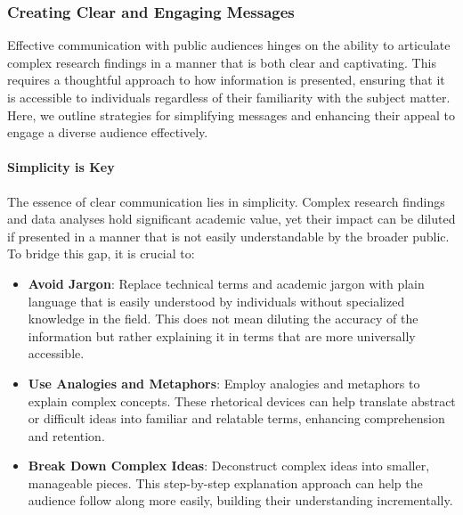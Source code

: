 \documentclass[
]{book}
\begin{document}
\hypertarget{creating-clear-and-engaging-messages}{%
\subsubsection*{Creating Clear and Engaging Messages}\label{creating-clear-and-engaging-messages}}

Effective communication with public audiences hinges on the ability to articulate complex research findings in a manner that is both clear and captivating. This requires a thoughtful approach to how information is presented, ensuring that it is accessible to individuals regardless of their familiarity with the subject matter. Here, we outline strategies for simplifying messages and enhancing their appeal to engage a diverse audience effectively.

\hypertarget{simplicity-is-key}{%
\paragraph{Simplicity is Key}\label{simplicity-is-key}}

The essence of clear communication lies in simplicity. Complex research findings and data analyses hold significant academic value, yet their impact can be diluted if presented in a manner that is not easily understandable by the broader public. To bridge this gap, it is crucial to:

\begin{itemize}
\item
  \textbf{Avoid Jargon}: Replace technical terms and academic jargon with plain language that is easily understood by individuals without specialized knowledge in the field. This does not mean diluting the accuracy of the information but rather explaining it in terms that are more universally accessible.
\item
  \textbf{Use Analogies and Metaphors}: Employ analogies and metaphors to explain complex concepts. These rhetorical devices can help translate abstract or difficult ideas into familiar and relatable terms, enhancing comprehension and retention.
\item
  \textbf{Break Down Complex Ideas}: Deconstruct complex ideas into smaller, manageable pieces. This step-by-step explanation approach can help the audience follow along more easily, building their understanding incrementally.
\end{itemize}
\end{document}

